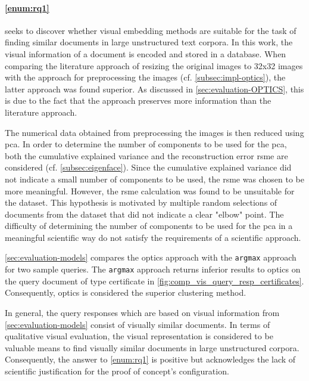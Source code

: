 \paragraph{\ref{enum:rq1}} seeks to discover whether visual embedding methods are suitable 
for the task of finding similar documents in large unstructured text corpora.
In this work, the visual information of a document is encoded and stored in a database.
When comparing the literature approach of resizing the original images to 32x32 images with the 
\eigendocs{} approach for preprocessing the images (cf. \autoref{subsec:impl-optics}), 
the latter approach was found superior.
As discussed in \autoref{sec:evaluation-OPTICS}, 
this is due to the fact that the \eigendocs{} approach preserves more information than the literature approach.

The numerical data obtained from preprocessing the images is then reduced using \ac{pca}.
In order to determine the number of components to be used for the \ac{pca}, 
both the cumulative explained variance and the reconstruction error \ac{rsme} are considered 
(cf. \autoref{subsec:eigenface}).
Since the cumulative explained variance did not indicate a small number of components to be used, 
the \ac{rsme} was chosen to be more meaningful.
However, the \ac{rsme} calculation was found to be unsuitable for the dataset.
This hypothesis is motivated by multiple random selections of documents from the dataset that
did not indicate a clear "elbow" point.
The difficulty of determining the number of components to be used for the \ac{pca} in a meaningful scientific way 
do not satisfy the requirements of a scientific approach.

\autoref{sec:evaluation-models} compares the \ac{optics} approach 
with the \texttt{argmax} approach for two sample queries.
The \texttt{argmax} approach returns inferior results to \ac{optics} on the query document 
of type certificate in \autoref{fig:comp_vis_query_resp_certificates}.
Consequently, \ac{optics} is considered the superior clustering method.

In general, the query responses which are based on visual information from \autoref{sec:evaluation-models} 
consist of visually similar documents.
In terms of qualitative visual evaluation, the visual representation is considered to be 
valuable means to find visually similar documents in large unstructured corpora.
Consequently, the answer to \ref{enum:rq1} is positive but 
acknowledges the lack of scientific justification for the proof of concept's configuration.